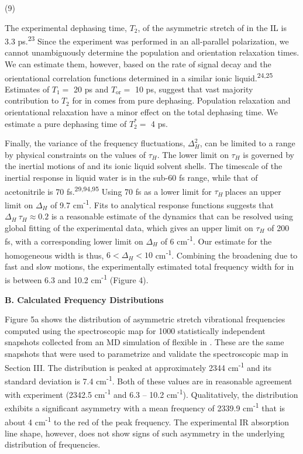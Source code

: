 \documentclass[]{article}
\begin{document}
(9)

The experimental dephasing time, \(T_{2}\), of the asymmetric stretch of  in the \ce{[C4C1im][PF6]} IL is 3.3 ps.\textsuperscript{23} Since the experiment was performed in an all-parallel polarization, we cannot unambiguously determine the population and orientation relaxation times. We can estimate them, however, based on the rate of signal decay and the orientational correlation functions determined in a similar ionic liquid.\textsuperscript{24,25} Estimates of \(T_{1} =\) 20 ps and \(T_{\mathrm{\text{or}}} =\) 10 ps, suggest that vast majority contribution to \(T_{2}\) for  in \ce{[C4C1im][PF6]} comes from pure dephasing. Population relaxation and orientational relaxation have a minor effect on the total dephasing time. We estimate a pure dephasing time of \(T_{2}^{*} =\) 4 ps.

Finally, the variance of the frequency fluctuations, \(\Delta_{H}^{2}\), can be limited to a range by physical constraints on the values of \(\tau_{H}\). The lower limit on \(\tau_{H}\) is governed by the inertial motions of  and its ionic liquid solvent shells. The timescale of the inertial response in liquid water is in the sub-60 fs range, while that of acetonitrile is 70 fs.\textsuperscript{29,94,95} Using 70 fs as a lower limit for \(\tau_{H}\ \)places an upper limit on \(\Delta_{H}\) of 9.7 cm\textsuperscript{-1}. Fits to analytical response functions suggests that \(\Delta_{H}\ \tau_{H} \approx 0.2\) is a reasonable estimate of the dynamics that can be resolved using global fitting of the experimental data, which gives an upper limit on \(\tau_{H}\) of 200 fs, with a corresponding lower limit on \(\Delta_{H}\) of 6 cm\textsuperscript{-1}. Our estimate for the homogeneous width is thus, \(6 < \Delta_{H} < 10\) cm\textsuperscript{‑1}. Combining the broadening due to fast and slow motions, the experimentally estimated total frequency width for  in \ce{[C4C1im][PF6]} is between 6.3 and 10.2 cm\textsuperscript{-1} (Figure 4).

\textbf{B. Calculated Frequency Distributions}

Figure 5a shows the distribution of  asymmetric stretch vibrational frequencies computed using the spectroscopic map for 1000 statistically independent snapshots collected from an MD simulation of flexible  in \ce{[C4C1im][PF6]}.  These are the same snapshots that were used to parametrize and validate the spectroscopic map in Section III. The distribution is peaked at approximately 2344 cm\textsuperscript{-1} and its standard deviation is 7.4 cm\textsuperscript{-1}. Both of these values are in reasonable agreement with experiment (2342.5 cm\textsuperscript{-1} and 6.3 -- 10.2 cm\textsuperscript{-1}). Qualitatively, the distribution exhibits a significant asymmetry with a mean frequency of 2339.9 cm\textsuperscript{-1} that is about 4 cm\textsuperscript{-1} to the red of the peak frequency. The experimental IR absorption line shape, however, does not show signs of such asymmetry in the underlying distribution of frequencies.
\end{document}
